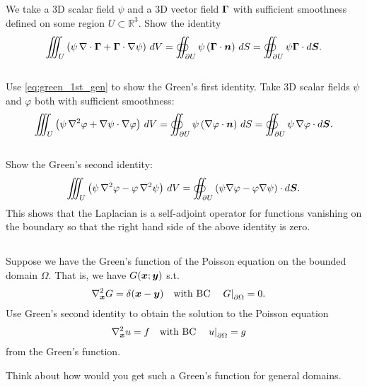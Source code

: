 \documentclass[11pt,letterpaper]{article}
\begin{document}
\subsection{}
We take a 3D scalar field $\psi$ and a 3D vector field $\boldsymbol{\Gamma}$ with sufficient smoothness defined on some region $U \subset \mathbb{R}^3$. Show the identity
\begin{align}
    \iiint_U \left( \psi \, \nabla \cdot \boldsymbol{\Gamma} + \boldsymbol{\Gamma} \cdot \nabla \psi\right)\, dV  = \oiint_{\partial U} \psi \left( \boldsymbol{\Gamma} \cdot \boldsymbol{n} \right)\, dS=\oiint_{\partial U}\psi\boldsymbol{\Gamma}\cdot d\boldsymbol{S}.\label{eq:green_1st_gen}
\end{align}

\subsection{}
Use \eqref{eq:green_1st_gen} to show the Green's first identity. Take 3D scalar fields $\psi$ and $\varphi$ both with sufficient smoothness:
\begin{align}
    \iiint_U \left( \psi \, \nabla^2 \varphi + \nabla \psi \cdot \nabla \varphi \right)\, dV  = \oiint_{\partial U} \psi \left( \nabla \varphi \cdot \boldsymbol{n} \right)\, dS=\oiint_{\partial U}\psi\,\nabla\varphi\cdot d\boldsymbol{S}.
\end{align}

\subsection{}
Show the Green's second identity:
\begin{align}
    \iiint_U \left( \psi \, \nabla^2 \varphi - \varphi \, \nabla^2 \psi\right)\, dV = \oiint_{\partial U} \left( \psi \nabla \varphi - \varphi \nabla \psi\right)\cdot d\boldsymbol{S}.
\end{align}
This shows that the Laplacian is a self-adjoint operator for functions vanishing on the boundary so that the right hand side of the above identity is zero.

\subsection{}
Suppose we have the Green's function of the Poisson equation on the bounded domain $\Omega$. That is, we have $G(\boldsymbol{x};\boldsymbol{y})$ s.t.
\begin{align}
    &\nabla_{\boldsymbol{x}}^2 G = \delta(\boldsymbol{x}-\boldsymbol{y})\quad \mbox{with BC} \quad \left.G\right|_{\partial\Omega} = 0.
\end{align}
Use Green's second identity to obtain the solution to the Poisson equation
\begin{align}
    &\nabla_{\boldsymbol{x}}^2 u = f\quad \mbox{with BC} \quad \left.u\right|_{\partial\Omega} = g
\end{align}
from the Green's function.

Think about how would you get such a Green's function for general domains. 

\vfill
\printbibliography
\end{document}
